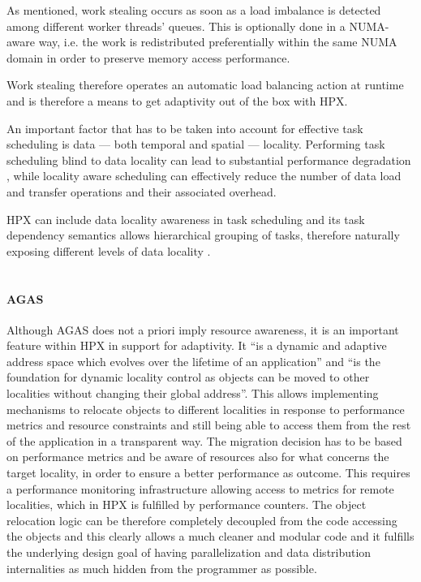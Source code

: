 As mentioned, work stealing occurs as soon as a load imbalance is detected among different worker threads' queues.
This is optionally done in a NUMA-aware way, i.e. the work is redistributed preferentially within the same NUMA domain in order to preserve memory access performance.

Work stealing therefore operates an automatic load balancing action at runtime and is therefore a means to get adaptivity out of the box with HPX.

An important factor that has to be taken into account for effective task scheduling is data --- both temporal and spatial --- locality. Performing task scheduling blind to data locality can lead to substantial performance degradation \cite{connelly1994workload}, while locality aware scheduling can effectively reduce the number of data load and transfer operations and their associated overhead.

HPX can include data locality awareness in task scheduling and its task dependency semantics allows hierarchical grouping of tasks, therefore naturally exposing different levels of data locality \cite{amatya2014parallel}.
~\\~

\paragraph{AGAS}
Although AGAS does not a priori imply resource awareness, it is an important feature within HPX in support for adaptivity. It ``is a dynamic and adaptive address space
which evolves over the lifetime of an application'' and ``is the foundation for dynamic locality control as objects can be moved to other localities without changing their global address''.\cite{kaiser2014hpx}
This allows implementing mechanisms to relocate objects to different localities in response to performance metrics and resource constraints \cite{amatya2014parallel} and still being able to access them from the rest of the application in a transparent way. The migration decision has to be based on performance metrics and be aware of resources also for what concerns the target locality, in order to ensure a better performance as outcome. This requires a performance monitoring infrastructure allowing access to metrics for remote localities, which in HPX is fulfilled by performance counters.
The object relocation logic can be therefore completely decoupled from the code accessing the objects and this clearly allows a much cleaner and modular code and it fulfills the underlying design goal of having parallelization and data distribution internalities as much hidden from the programmer as possible.
~\\~

